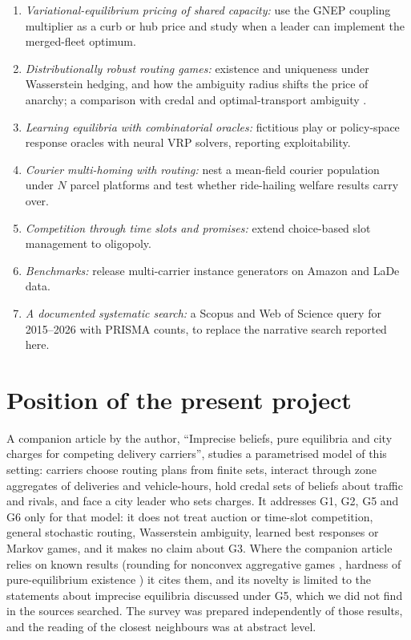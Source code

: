 \documentclass[preprint,12pt]{elsarticle}
\begin{document}
\begin{enumerate}[leftmargin=*]
\item \emph{Variational-equilibrium pricing of shared capacity:} use the GNEP coupling multiplier as a curb or hub price and study when a leader can implement the merged-fleet optimum.
\item \emph{Distributionally robust routing games:} existence and uniqueness under Wasserstein hedging, and how the ambiguity radius shifts the price of anarchy; a comparison with credal and optimal-transport ambiguity \cite{Feik2026}.
\item \emph{Learning equilibria with combinatorial oracles:} fictitious play or policy-space response oracles with neural VRP solvers, reporting exploitability.
\item \emph{Courier multi-homing with routing:} nest a mean-field courier population under $N$ parcel platforms and test whether ride-hailing welfare results carry over.
\item \emph{Competition through time slots and promises:} extend choice-based slot management to oligopoly.
\item \emph{Benchmarks:} release multi-carrier instance generators on Amazon and LaDe data.
\item \emph{A documented systematic search:} a Scopus and Web of Science query for 2015--2026 with PRISMA counts, to replace the narrative search reported here.
\end{enumerate}

\section{Position of the present project}\label{sec:position}

A companion article by the author, ``Imprecise beliefs, pure equilibria and city charges for competing delivery carriers'', studies a parametrised model of this setting: carriers choose routing plans from finite sets, interact through zone aggregates of deliveries and vehicle-hours, hold credal sets of beliefs about traffic and rivals, and face a city leader who sets charges. It addresses G1, G2, G5 and G6 only for that model: it does not treat auction or time-slot competition, general stochastic routing, Wasserstein ambiguity, learned best responses or Markov games, and it makes no claim about G3. Where the companion article relies on known results (rounding for nonconvex aggregative games \cite{Liu2023}, hardness of pure-equilibrium existence \cite{Apt2022}) it cites them, and its novelty is limited to the statements about imprecise equilibria discussed under G5, which we did not find in the sources searched. The survey was prepared independently of those results, and the reading of the closest neighbours \cite{Beauchene2016,Feik2026} was at abstract level.
\end{document}
